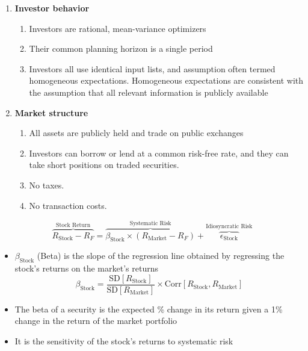 \documentclass{beamer}
\begin{document}
\begin{frame}{}
	\begin{enumerate}
		\item \textbf{Investor behavior}
			\begin{enumerate}
				\item Investors are rational, mean-variance optimizers
				\item Their common planning horizon is a single period
				\item Investors all use identical input lists, and assumption often termed homogeneous expectations. Homogeneous expectations are consistent with the assumption that all relevant information is publicly available
			\end{enumerate}
		\item \textbf{Market structure}
			\begin{enumerate}
				\item All assets are publicly held and trade on public exchanges
				\item Investors can borrow or lend at a common risk-free rate, and they can take short positions on traded securities.
				\item No taxes.
				\item No transaction costs. 
			\end{enumerate}
	\end{enumerate}
\end{frame}

\begin{frame}{}
\begin{equation*}
\overbrace{R_{\text{Stock}}-R_{F}}^{\text{Stock Return}}=\overbrace{\beta_{\text{Stock}}\times(R_{\text{Market}}-R_{F})}^{\text{Systematic Risk}}+\overbrace{\epsilon_{\text{Stock}}}^{\text{Idiosyncratic Risk}}
\end{equation*}
\begin{itemize}
\item $\beta_{\text{Stock}}$ (Beta) is the slope of the regression line obtained by regressing the stock's returns on the market's returns
\begin{equation}
\beta_{\text{Stock}}=\frac{\text{SD}[R_{\text{Stock}}]}{\text{SD}[R_{\text{Market}}]}\times\text{Corr}[R_{\text{Stock}},R_{\text{Market}}]
\end{equation}
\item The beta of a security is the expected \% change in its return given a 1\% change in the return of the market portfolio
\item It is the sensitivity of the stock's returns to systematic risk
\end{itemize}
\end{frame}
\end{document}
